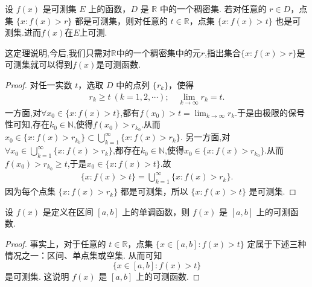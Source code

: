 \documentclass[../../main.tex]{subfiles}%
\begin{document}
\begin{theorem}\label{theorem:定理3.1}
设 \(f(x)\) 是可测集 \(E\) 上的函数，\(D\) 是 \(\mathbb{R}\) 中的一个稠密集. 若对任意的 \(r \in D\)，点集 \(\{x: f(x) > r\}\) 都是可测集，则对任意的 \(t \in \mathbb{R}\)，点集 \(\{x: f(x) > t\}\) 也是可测集.进而$f(x)$在$E$上可测.
\end{theorem}
\begin{note}
这定理说明,今后,我们只需对$\mathbb{R}$中的一个稠密集中的元$r$,指出集合$\{x:f(x)>r\}$是可测集就可以得到$f(x)$是可测函数.
\end{note}
\begin{proof}

对任一实数 \(t\)，选取 \(D\) 中的点列 \(\{r_k\}\)，使得
\begin{align*}
r_k \geqslant t\ (k = 1,2,\cdots); \quad \lim_{k \to \infty}r_k = t.
\end{align*}
一方面,对$\forall x_0\in \{x:f(x)>t\}$,都有$f(x_0)>t=\lim_{k\to \infty}r_k$.于是由极限的保号性可知,存在$k_0\in \mathbb{N}$,使得$f(x_0)>r_{k_0}$.从而$x_0\in \{x:f(x)>r_{k_0}\}\subset \bigcup_{k = 1}^{\infty}\{x: f(x) > r_k\}$.
另一方面,对$\forall x_0\in \bigcup_{k = 1}^{\infty}\{x: f(x) > r_k\}$,都存在$k_0\in \mathbb{N}$,使得$x_0\in \{x:f(x)>r_{k_0}\}$.从而$f(x_0)>r_{k_0}\geqslant  t$,于是$x_0\in \{x:f(x)>t\}$.故
\begin{align}
\{x: f(x) > t\} = \bigcup_{k = 1}^{\infty}\{x: f(x) > r_k\}. \label{eq:3.1}
\end{align}
因为每个点集 \(\{x: f(x) > r_k\}\) 都是可测集，所以 \(\{x: f(x) > t\}\) 是可测集. 

\end{proof}

\begin{proposition}
设 \(f(x)\) 是定义在区间 \([a,b]\) 上的单调函数，则 \(f(x)\) 是 \([a,b]\) 上的可测函数.
\end{proposition}
\begin{proof}

事实上，对于任意的 \(t \in \mathbb{R}\)，点集 \(\{x \in [a,b]: f(x) > t\}\) 定属于下述三种情况之一：区间、单点集或空集. 从而可知
\[
\{x \in [a,b]: f(x) > t\}
\]
是可测集. 这说明 \(f(x)\) 是 \([a,b]\) 上的可测函数. 

\end{proof}
\end{document}
